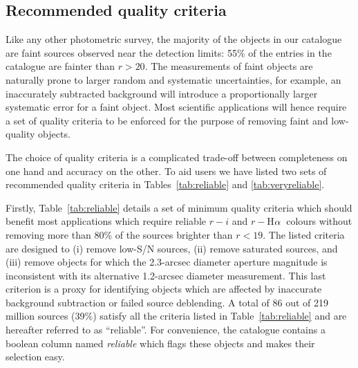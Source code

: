 \documentclass[useAMS,usenatbib]{mn2e}
\def\ha{\mbox{H$\rm \alpha$}}
\begin{document}
\subsection{Recommended quality criteria}
\label{sec:qualitycriteria}

Like any other photometric survey,
the majority of the objects in our catalogue
are faint sources observed near the detection limits:
55\% of the entries in the catalogue
are fainter than $r > 20$.
The measurements of faint objects
are naturally prone to larger
random and systematic uncertainties,
for example, an inaccurately subtracted background
will introduce a proportionally larger systematic error
for a faint object.
Most scientific applications will hence require a set of
quality criteria to be enforced for the purpose
of removing faint and low-quality objects.

The choice of quality criteria is a complicated
trade-off between completeness on one hand
and accuracy on the other.
To aid users we have listed two sets of
recommended quality criteria 
in Tables~\ref{tab:reliable} and \ref{tab:veryreliable}.

Firstly, Table~\ref{tab:reliable} details
a set of minimum quality criteria
which should benefit most applications
which require reliable $r-i$ and $r-$\ha\ colours
without removing more than 80\%
of the sources brighter than $r < 19$.
The listed criteria are designed to 
(i) remove low-S/N sources, 
(ii) remove saturated sources,
and (iii) remove objects for which the 2.3-arcsec diameter
aperture magnitude is inconsistent 
with its alternative 1.2-arcsec diameter measurement.
This last criterion is a proxy
for identifying objects which are affected
by inaccurate background subtraction
or failed source deblending.
A total of 86 out of 219 million sources 
(39\%) satisfy all the criteria listed in Table~\ref{tab:reliable}
and are hereafter referred to as ``reliable''.
For convenience, the catalogue contains a boolean column
named \emph{reliable} which flags these objects
and makes their selection easy.
\end{document}
